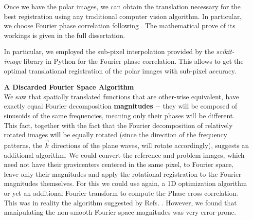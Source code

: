 \documentclass[11pt, a4paper, twoside]{article} %
\DeclareRobustCommand{\mybox}[2][gray!10]{%
\begin{tcolorbox}[   %
        left=0.2cm,
        right=0.2cm,
        top=0.15cm,
        bottom=0.15cm,
        colback=#1,
        colframe=#1,
        width=\dimexpr\textwidth\relax, 
        enlarge left by=0mm,
        boxsep=5pt,
        arc=0pt,outer arc=0pt,
        ]
        #2
\end{tcolorbox}
}
\begin{document}
Once we have the polar images, we can obtain the translation necessary for the best registration using any traditional computer vision algorithm. In particular, we choose Fourier phase correlation following \cite{phase,phase2}. The mathematical prove of its workings is given in the full dissertation. \vspace{-0.15cm}



In particular, we employed the sub-pixel interpolation provided by the {\em scikit-image} library in Python \cite{skimage} for the Fourier phase correlation. This allows to get the optimal translational registration of the polar images with sub-pixel accuracy.



\mybox{{\bf A Discarded Fourier Space Algorithm\vspace{0.13cm} \\}
We saw that spatially translated functions that are other-wise equivalent, have exactly equal Fourier decomposition {\bf magnitudes} $-$ they will be composed of sinusoids of the same frequencies, meaning only their phases will be different. This fact, together with the fact that the Fourier decomposition of relatively rotated images will be equally rotated (since the direction of the frequency patterns, the $\vec{k}$ directions of the plane waves, will rotate accordingly), suggests an additional algorithm. We could convert the reference and problem images, which need not have their gravicenters centered in the same pixel, to Fourier space, leave only their magnitudes and apply the rotational registration to the Fourier magnitudes themselves. For this we could use again, a 1D optimization algorithm or yet an additional Fourier transform to compute the Phase cross correlation. This was in reality the algorithm suggested by Refs. \cite{phase,phase2}. However, we found that manipulating the non-smooth Fourier space magnitudes was very error-prone.
}\vspace{-0.2cm}
\end{document}
